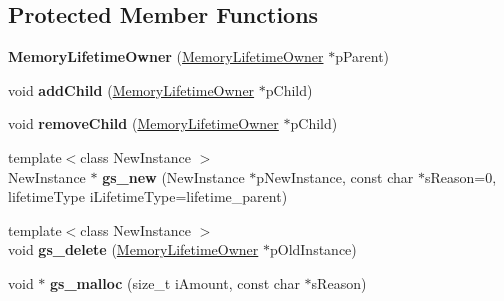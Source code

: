 \subsection*{\-Protected \-Member \-Functions}
\begin{DoxyCompactItemize}
\item 
\hypertarget{classgeneral__server_1_1MemoryLifetimeOwner_a2950bda759cacb309e240133eee2053a}{{\bfseries \-Memory\-Lifetime\-Owner} (\hyperlink{classgeneral__server_1_1MemoryLifetimeOwner}{\-Memory\-Lifetime\-Owner} $\ast$p\-Parent)}\label{classgeneral__server_1_1MemoryLifetimeOwner_a2950bda759cacb309e240133eee2053a}

\item 
\hypertarget{classgeneral__server_1_1MemoryLifetimeOwner_a73a3202be5844f2d83d1e203e2854a6c}{void {\bfseries add\-Child} (\hyperlink{classgeneral__server_1_1MemoryLifetimeOwner}{\-Memory\-Lifetime\-Owner} $\ast$p\-Child)}\label{classgeneral__server_1_1MemoryLifetimeOwner_a73a3202be5844f2d83d1e203e2854a6c}

\item 
\hypertarget{classgeneral__server_1_1MemoryLifetimeOwner_a5f7d7a1a467f23b9c23d020d128e8048}{void {\bfseries remove\-Child} (\hyperlink{classgeneral__server_1_1MemoryLifetimeOwner}{\-Memory\-Lifetime\-Owner} $\ast$p\-Child)}\label{classgeneral__server_1_1MemoryLifetimeOwner_a5f7d7a1a467f23b9c23d020d128e8048}

\item 
\hypertarget{classgeneral__server_1_1MemoryLifetimeOwner_ac3338195b955b88a55f1b71de3d72ac0}{{\footnotesize template$<$class New\-Instance $>$ }\\\-New\-Instance $\ast$ {\bfseries gs\-\_\-new} (\-New\-Instance $\ast$p\-New\-Instance, const char $\ast$s\-Reason=0, lifetime\-Type i\-Lifetime\-Type=lifetime\-\_\-parent)}\label{classgeneral__server_1_1MemoryLifetimeOwner_ac3338195b955b88a55f1b71de3d72ac0}

\item 
\hypertarget{classgeneral__server_1_1MemoryLifetimeOwner_a94bc109ea46522342e8b5ff793931616}{{\footnotesize template$<$class New\-Instance $>$ }\\void {\bfseries gs\-\_\-delete} (\hyperlink{classgeneral__server_1_1MemoryLifetimeOwner}{\-Memory\-Lifetime\-Owner} $\ast$p\-Old\-Instance)}\label{classgeneral__server_1_1MemoryLifetimeOwner_a94bc109ea46522342e8b5ff793931616}

\item 
\hypertarget{classgeneral__server_1_1MemoryLifetimeOwner_a8f1b47366a6b8b7b0297e1a1faf37370}{void $\ast$ {\bfseries gs\-\_\-malloc} (size\-\_\-t i\-Amount, const char $\ast$s\-Reason)}\label{classgeneral__server_1_1MemoryLifetimeOwner_a8f1b47366a6b8b7b0297e1a1faf37370}


\end{DoxyCompactItemize}
